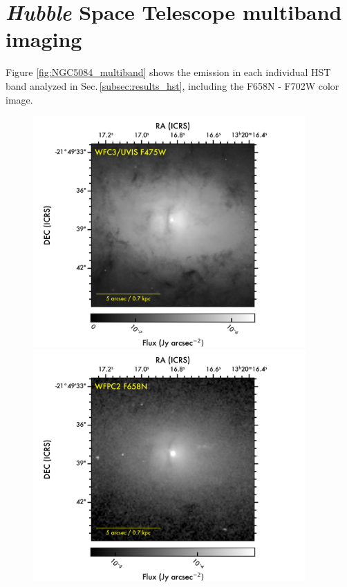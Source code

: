 \documentclass[modern]{CORE-AAS/aastex631}
\begin{document}
\section{\emph{Hubble} Space Telescope multiband imaging}
\label{Appendix:Hubble_subbands}
Figure \ref{fig:NGC5084_multiband} shows the emission in each individual HST band analyzed in Sec.\,\ref{subsec:results_hst}, including the F658N - F702W color image. 
\begin{figure}[]
\begin{center}
\includegraphics[trim={0 25 60 0}, clip, height=8.85cm]{FIGURES/NGC5084_F475W.png}
\includegraphics[trim={140 25 60 0}, clip, height=8.85cm]{FIGURES/NGC5084_F658N.png}

\end{center}
\end{figure}
\end{document}
